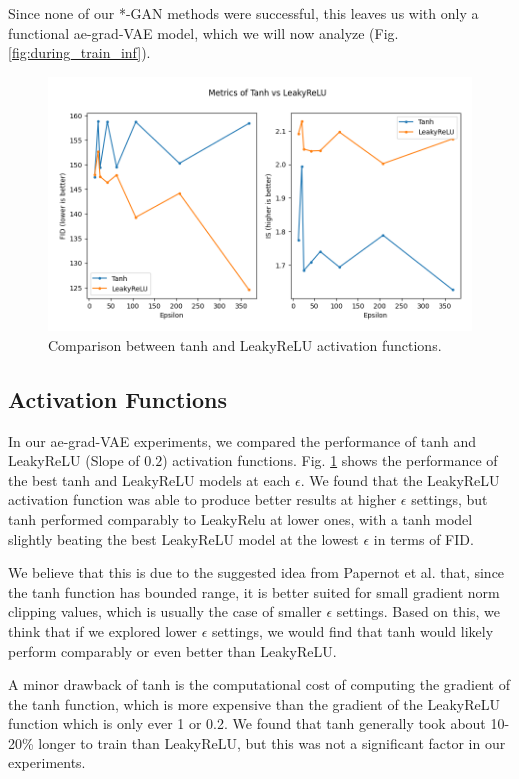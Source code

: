\documentclass{article}
\begin{document}
Since none of our *-GAN methods were successful, this leaves us with only a functional ae-grad-VAE model, which we will now analyze (Fig. \ref{fig:during_train_inf}).

\begin{figure}[!h]
    \centering
    \includegraphics[width=0.8\columnwidth]{images/activation.png}
    \caption{Comparison between tanh and LeakyReLU activation functions.}
    \label{fig:activation}
\end{figure}


\subsection{Activation Functions}
In our ae-grad-VAE experiments, we compared the performance of tanh and LeakyReLU (Slope of $0.2$) activation functions. Fig. \ref{fig:activation} shows the performance of the best tanh and LeakyReLU models at each $\epsilon$. We found that the LeakyReLU activation function was able to produce better results at higher $\epsilon$ settings, but tanh performed comparably to LeakyRelu at lower ones, with a tanh model slightly beating the best LeakyReLU model at the lowest $\epsilon$ in terms of FID. 

We believe that this is due to the suggested idea from Papernot et al. \cite{sig} that, since the tanh function has bounded range, it is better suited for small gradient norm clipping values, which is usually the case of smaller $\epsilon$ settings. Based on this, we think that if we explored lower $\epsilon$ settings, we would find that tanh would likely perform comparably or even better than LeakyReLU. 

A minor drawback of tanh is the computational cost of computing the gradient of the tanh function, which is more expensive than the gradient of the LeakyReLU function which is only ever 1 or 0.2. We found that tanh generally took about 10-20\% longer to train than LeakyReLU, but this was not a significant factor in our experiments.
\end{document}

